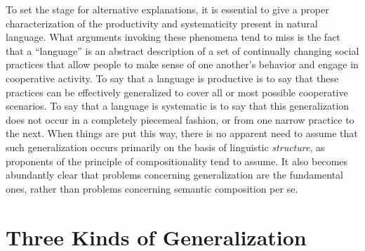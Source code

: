 To set the stage for alternative explanations, it is essential to give a proper characterization of the productivity and systematicity present in natural language. What arguments invoking these phenomena tend to miss is the fact that a ``language'' is an abstract description of a set of continually changing social practices that allow people to make sense of one another's behavior and engage in cooperative activity. To say that a language is productive is to say that these practices can be effectively generalized to cover all or most possible cooperative scenarios. To say that a language is systematic is to say that this generalization does not occur in a completely piecemeal fashion, or from one narrow practice to the next. When things are put this way, there is no apparent need to assume that such generalization occurs primarily on the basis of linguistic \textit{structure}, as proponents of the principle of compositionality tend to assume. It also becomes abundantly clear that problems concerning generalization are the fundamental ones, rather than problems concerning semantic composition per se.

\section{Three Kinds of Generalization}

